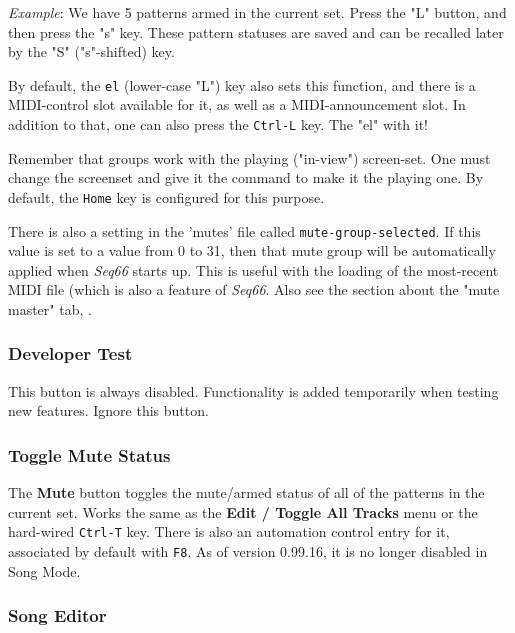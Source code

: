    \textsl{Example}:
   We have 5 patterns armed in the current set. Press the "L" button,
   and then press the "s" key.  These pattern statuses are saved and can be
   recalled later by the "S" ("s"-shifted) key.

   By default, the \texttt{el} (lower-case "L") key also sets this function,
   and there is a MIDI-control slot available for it, as well as a
   MIDI-announcement slot.
   In addition to that, one can also press
   the \texttt{Ctrl-L} key.
   The "el" with it!

   Remember that groups work with the playing ("in-view") screen-set.
   One must change the screenset and give it the command to make it the
   playing one.
   By default, the \texttt{Home} key is configured for this purpose.

   There is also a setting in the 'mutes' file called
   \texttt{mute-group-selected}.  If this value is set to a value from 0 to 31,
   then that mute group will be automatically applied when
   \textsl{Seq66} starts up.
   This is useful with the loading of the most-recent MIDI file (which is also
   a feature of \textsl{Seq66}.
   Also see the section about the "mute master" tab,
   .

\subsubsection{Developer Test}
\label{subsubsec:introduction_developer_test_button}

   This button is always disabled.  Functionality is added temporarily when
   testing new features. Ignore this button.

\subsubsection{Toggle Mute Status}
\label{subsubsec:introduction_toggle_mute_status_button}

   The \textbf{Mute}  button toggles the mute/armed status of all of the
   patterns in the current set.
   Works the same as the
   \textbf{Edit / Toggle All Tracks} menu or the hard-wired
   \texttt{Ctrl-T} key.
   There is also an automation control entry for it, associated by
   default with \texttt{F8}.
   As of version 0.99.16, it is no longer disabled in Song Mode.

\subsubsection{Song Editor}
\label{subsubsec:introduction_song_editor_button}


